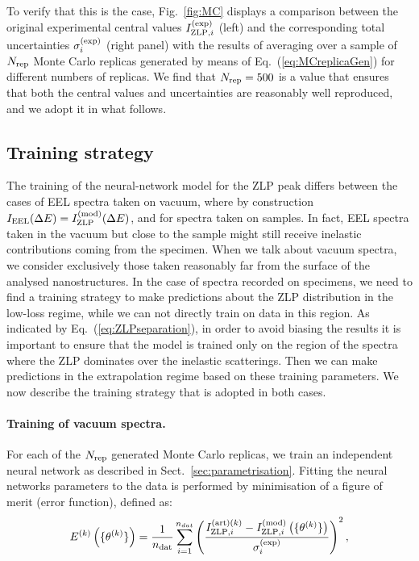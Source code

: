 To verify that this is the case,
Fig.~\ref{fig:MC} displays a comparison between the original experimental central values
$I_{{\rm ZLP},i}^{\rm (exp)}$ (left) and the corresponding 
total uncertainties $\sigma_i^{(\rm exp)}$ (right panel) with the results of averaging over
a sample of $N_{\rm rep}$ Monte Carlo replicas generated by means of
Eq.~(\ref{eq:MCreplicaGen}) for different numbers of replicas.
%
We find that $N_{\rm rep}=500$ is a value that ensures that both
the central values and uncertainties are reasonably well reproduced,
and we adopt it in what follows.


\subsection{Training strategy}
\label{sec:training}

The training of the neural-network model for the ZLP peak differs between
the cases of EEL spectra taken on vacuum,
where by construction $I_{\rm EEL}(\Delta E) =I_{\rm ZLP}^{\rm (mod)}(\Delta E)$,
and for spectra taken on samples. 
%
In fact, EEL spectra taken in the vacuum but close
to the sample might still receive inelastic contributions coming from the specimen.
%
When we talk about vacuum spectra, we consider exclusively those taken 
reasonably far from the surface of the analysed nanostructures.
%
In the case of spectra recorded on specimens, we need to find a training strategy to make predictions
about the ZLP distribution in the low-loss regime, while we can not directly
train on data in this region.
%
As indicated by Eq.~(\ref{eq:ZLPseparation}), in order to avoid
biasing the results it is important to ensure that the model is trained only on the region of the spectra
where the ZLP dominates over the inelastic scatterings.
%
Then we can make predictions in the extrapolation regime based on these 
training parameters.
%
We now describe the training strategy that is adopted in both cases.

\paragraph{Training of vacuum spectra.}
%
For each of the $N_{\rm rep}$ generated Monte Carlo replicas, we train an independent
neural network as described in Sect.~\ref{sec:parametrisation}.
%
Fitting the neural networks parameters to the data is performed by minimisation of a
figure of merit (error function), defined as:
\begin{equation}
  \label{eq:chi2}
\begin{centering}
  E^{(k)}\lp \{\theta^{(k)}\}\rp = \frac{1}{n_{\rm dat}}\sum_{i=1}^{n_{dat}}\left(\frac{ I_{{\rm ZLP},i}^{{\rm (art)}(k)} -
  I_{{\rm ZLP},i}^{{\rm (mod)}}\lp \{\theta^{(k)}\}\rp }{\sigma_i^{(\rm exp)}}\right)^2, 
\end{centering}
\end{equation}

